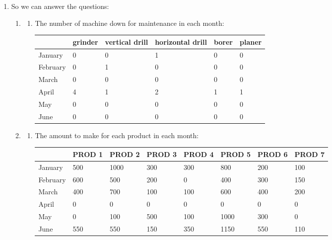 \documentclass[12pt,a4paper]{article}
\makeatletter
\newtheorem*{solution}{Solution}
\theoremstyle{definition}
\renewenvironment{solution}[1][Solution] {\par\pushQED{\qed}\normalfont\topsep6\p@\@plus6\p@\relax\trivlist\item[\hskip\labelsep\bfseries#1\@addpunct{.}]\ignorespaces}{\popQED\endtrivlist\@endpefalse} \makeatother
\makeatother
\begin{document}
\begin{enumerate}
\begin{solution}
\begin{enumerate}
So we can answer the questions:

\begin{enumerate}
\item
\begin{enumerate}
\item The number of machine down for maintenance in each month:

\begin{table}[htbp]
      \scriptsize
      \centering
      \renewcommand\arraystretch{1.1}
      \begin{tabular}{m{} m{}<{\centering} m{}<{\centering} m{}<{\centering} m{}<{\centering} m{}<{\centering} }
      \hline
       & \textbf{grinder} & \textbf{vertical drill} & \textbf{horizontal drill} & \textbf{borer} & \textbf{planer}  \\\hline
      January & 0 & 0 & 1 & 0 & 0  \\
      February & 0 & 1 & 0 & 0 & 0  \\
      March & 0 & 0 & 0 & 0 & 0  \\
      April & 4 & 1 & 2 & 1 & 1  \\
      May & 0 & 0 & 0 & 0 & 0  \\
      June & 0 & 0 & 0 & 0 & 0 \\
      \hline
      \end{tabular}
    \end{table}
\end{enumerate}

\item
\begin{enumerate}
\item The amount to make for each product in each month:

    \begin{table}[htbp]
      \scriptsize
      \centering
      \renewcommand\arraystretch{1.1}
      \begin{tabular}{m{} m{}<{\centering} m{}<{\centering} m{}<{\centering} m{}<{\centering} m{}<{\centering} m{}<{\centering} m{}<{\centering}}
      \hline
       & \textbf{PROD 1} & \textbf{PROD 2} & \textbf{PROD 3} & \textbf{PROD 4} & \textbf{PROD 5} & \textbf{PROD 6} &  \textbf{PROD 7} \\\hline
      January & 500 & 1000 & 300 & 300 & 800 & 200 & 100 \\
      February & 600 & 500 & 200 & 0 & 400 & 300 & 150 \\
      March & 400 & 700 & 100 & 100 & 600 & 400 & 200 \\
      April & 0 & 0 & 0 & 0 & 0 & 0 & 0 \\
      May & 0 & 100 & 500 & 100 & 1000 & 300 & 0 \\
      June & 550 & 550 & 150 & 350 & 1150 & 550 & 110 \\
      \hline
      \end{tabular}
    \end{table}


\end{enumerate}
\end{enumerate}
\end{enumerate}
\end{solution}
\end{enumerate}
\end{document}
